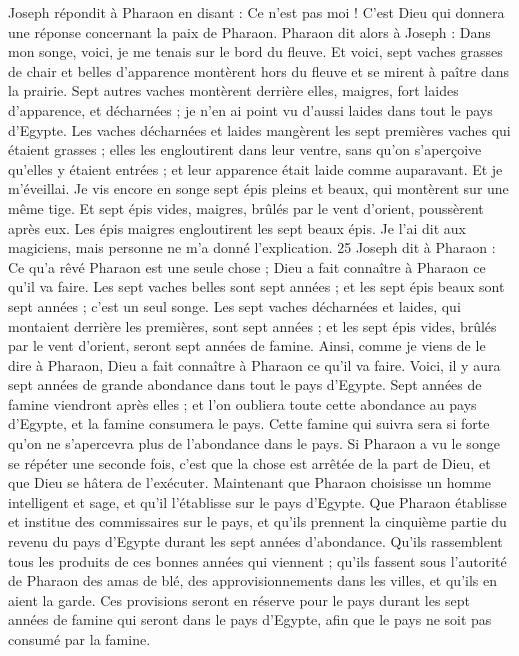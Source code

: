 \begin{multicols}{2}
Joseph répondit à Pharaon en disant : Ce n’est pas moi !  C’est Dieu qui donnera une réponse concernant la paix de Pharaon.
Pharaon dit alors à Joseph : Dans mon songe, voici, je me tenais sur le bord du fleuve.
Et voici, sept vaches grasses de chair et belles d’apparence montèrent hors du fleuve et se mirent à paître dans la prairie.
Sept autres vaches montèrent derrière elles, maigres, fort laides d’apparence, et décharnées ; je n’en ai point vu d’aussi laides dans tout le pays d’Egypte.
Les vaches décharnées et laides mangèrent les sept premières vaches qui étaient grasses ;
elles les engloutirent dans leur ventre, sans qu’on s’aperçoive qu’elles y étaient entrées ; et leur apparence était laide comme auparavant. Et je m’éveillai.
Je vis encore en songe sept épis pleins et beaux, qui montèrent sur une même tige.
Et sept épis vides, maigres, brûlés par le vent d’orient, poussèrent après eux.
Les épis maigres engloutirent les sept beaux épis. Je l’ai dit aux magiciens, mais personne ne m’a donné l’explication. 25 Joseph dit à Pharaon : Ce qu’a rêvé Pharaon est une seule chose ; Dieu a fait connaître à Pharaon ce qu’il va faire.
Les sept vaches belles sont sept années ; et les sept épis beaux sont sept années ; c’est un seul songe.
Les sept vaches décharnées et laides, qui montaient derrière les premières, sont sept années ; et les sept épis vides, brûlés par le vent d’orient, seront sept années de famine.
Ainsi, comme je viens de le dire à Pharaon, Dieu a fait connaître à Pharaon ce qu’il va faire.
Voici, il y aura sept années de grande abondance dans tout le pays d’Egypte.
Sept années de famine viendront après elles ; et l’on oubliera toute cette abondance au pays d’Egypte, et la famine consumera le pays.
Cette famine qui suivra sera si forte qu’on ne s’apercevra plus de l’abondance dans le pays.
Si Pharaon a vu le songe se répéter une seconde fois, c’est que la chose est arrêtée de la part de Dieu, et que Dieu se hâtera de l’exécuter.
Maintenant que Pharaon choisisse un homme intelligent et sage, et qu'il l'établisse sur le pays d'Egypte.
Que Pharaon établisse et institue des commissaires sur le pays, et qu'ils prennent la cinquième partie du revenu du pays d'Egypte durant les sept années d'abondance.
Qu’ils rassemblent tous les produits de ces bonnes années  qui viennent ; qu’ils fassent sous l’autorité de Pharaon des amas de blé, des approvisionnements dans les villes, et qu’ils en aient la garde.
Ces provisions seront en réserve pour le pays durant les sept années de famine qui seront dans le  pays d'Egypte, afin que le pays ne soit pas consumé par la famine.

\end{multicols}
